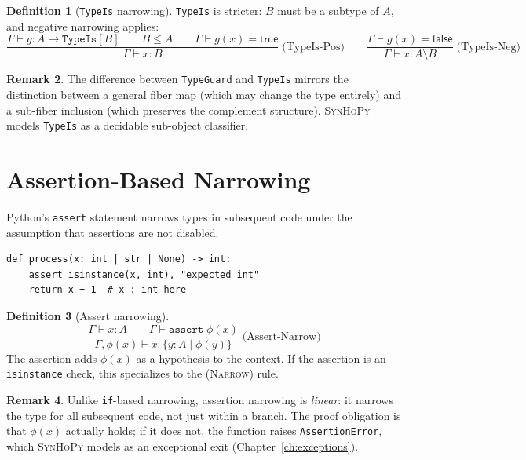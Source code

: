 \documentclass[11pt,a4paper]{report}
\theoremstyle{definition}
\newtheorem{definition}{Definition}[chapter]
\newtheorem{remark}[definition]{Remark}
\theoremstyle{plain}
\newcommand{\synhopy}{\textsc{SynHoPy}}
\begin{document}
\begin{definition}[\texttt{TypeIs} narrowing]
\texttt{TypeIs} is stricter: $B$ must be a subtype of $A$, and negative
narrowing applies:
\[
  \frac{
    \Gamma \vdash g : A \to \texttt{TypeIs}[B] \qquad
    B \leq A \qquad
    \Gamma \vdash g(x) = \mathsf{true}
  }{
    \Gamma \vdash x : B
  }
  \;\text{(TypeIs-Pos)}
  \qquad
  \frac{
    \Gamma \vdash g(x) = \mathsf{false}
  }{
    \Gamma \vdash x : A \setminus B
  }
  \;\text{(TypeIs-Neg)}
\]
\end{definition}

\begin{remark}
The difference between \texttt{TypeGuard} and \texttt{TypeIs} mirrors the
distinction between a general fiber map (which may change the type entirely)
and a sub-fiber inclusion (which preserves the complement structure).
\synhopy{} models \texttt{TypeIs} as a decidable sub-object classifier.
\end{remark}

\section{Assertion-Based Narrowing}

Python's \texttt{assert} statement narrows types in subsequent code under
the assumption that assertions are not disabled.

\begin{lstlisting}[style=python]
def process(x: int | str | None) -> int:
    assert isinstance(x, int), "expected int"
    return x + 1  # x : int here
\end{lstlisting}

\begin{definition}[Assert narrowing]
\[
  \frac{
    \Gamma \vdash x : A \qquad
    \Gamma \vdash \texttt{assert}\; \phi(x)
  }{
    \Gamma, \phi(x) \vdash x : \{y : A \mid \phi(y)\}
  }
  \;\text{(Assert-Narrow)}
\]
The assertion adds $\phi(x)$ as a hypothesis to the context.  If the
assertion is an \texttt{isinstance} check, this specializes to the
\textsc{(Narrow)} rule.
\end{definition}

\begin{remark}
Unlike \texttt{if}-based narrowing, assertion narrowing is \emph{linear}:
it narrows the type for all subsequent code, not just within a branch.
The proof obligation is that $\phi(x)$ actually holds; if it does not,
the function raises \texttt{AssertionError}, which \synhopy{} models as
an exceptional exit (Chapter~\ref{ch:exceptions}).
\end{remark}
\end{document}
